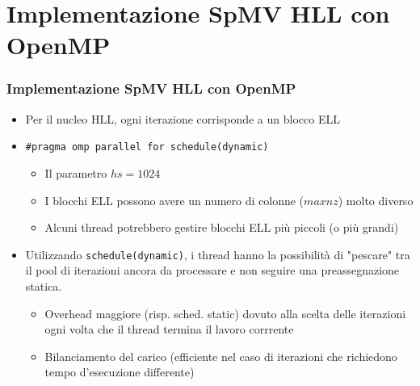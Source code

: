 \documentclass{beamer}
\begin{document}
\section{Implementazione SpMV HLL con OpenMP}
\begin{frame}
    \frametitle{Implementazione SpMV HLL con OpenMP}
    
    \begin{itemize}
    	\item Per il nucleo HLL, ogni iterazione corrisponde a un blocco ELL
    	\item \texttt{\#pragma omp parallel for schedule(dynamic)}
    	\begin{itemize}
    		\item Il parametro $hs = 1024$
    		\item I blocchi ELL possono avere un numero di colonne ($maxnz$) molto diverso 
    		\item Alcuni thread potrebbero gestire blocchi ELL più piccoli (o più grandi)
    	\end{itemize}
    	\item Utilizzando \texttt{schedule(dynamic)}, i thread hanno la possibilità
    	di "pescare" tra il pool di iterazioni ancora da processare e non seguire una
    	preassegnazione statica.
    	\begin{itemize}
    		\item Overhead maggiore (risp. sched. static)
    		dovuto alla scelta delle iterazioni ogni volta che il thread
    		termina il lavoro corrrente 
    		\item Bilanciamento del carico (efficiente nel caso di iterazioni
    		che richiedono tempo d'esecuzione differente)
    	\end{itemize}
    \end{itemize}
\end{frame}
\end{document}
